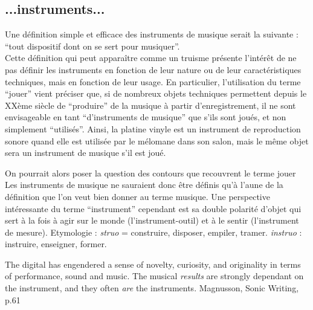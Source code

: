 \subsection*{...instruments...}
Une définition simple et efficace des instruments de musique serait la suivante : ``tout dispositif dont on se sert pour musiquer''.\\
Cette définition qui peut apparaître comme un truisme présente l'intérêt de ne pas définir les instruments en fonction de leur nature ou de leur caractéristiques techniques, mais en fonction de leur usage. En particulier, l'utilisation du terme ``jouer'' vient préciser que, si de nombreux objets techniques permettent depuis le XXème siècle de ``produire'' de la musique à partir d'enregistrement, il ne sont envisageable en tant ``d'instruments de musique'' que s'ils sont joués, et non simplement ``utilisés''. Ainsi, la platine vinyle est un instrument de reproduction sonore quand elle est utilisée par le mélomane dans son salon, mais le même objet sera un instrument de musique s'il est joué.

On pourrait alors poser la question des contours que recouvrent le terme jouer
Les instruments de musique ne sauraient donc être définis qu'à l'aune de la définition que l'on veut bien donner au terme musique. Une perspective intéressante du terme ``instrument'' cependant est sa double polarité d'objet qui sert à la fois à agir sur le monde (l'instrument-outil) et à le sentir (l'instrument de mesure).
Etymologie : \textit{struo} = construire, disposer, empiler, tramer.  \textit{instruo} : instruire, enseigner, former.

\cite{Todo : Christopher Small}

The digital has engendered a sense of novelty, curiosity, and originality in terms of performance, sound and music. The musical \textit{results} are strongly dependant on the instrument, and they often \textit{are} the instruments. Magnusson, Sonic Writing, p.61

